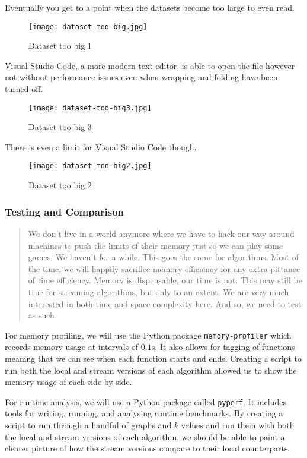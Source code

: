 Eventually you get to a point when the datasets become too large to even
read.

\begin{figure}[htb]
    \centering
    \texttt{[image: dataset-too-big.jpg]}
    \caption{Dataset too big 1}
\end{figure}

Visual Studio Code, a more modern text editor, is able to open the file
however not without performance issues even when wrapping and folding
have been turned off.

\begin{figure}[htb]
    \centering
    \texttt{[image: dataset-too-big3.jpg]}
    \caption{Dataset too big 3}
\end{figure}

There is even a limit for Visual Studio Code though.

\begin{figure}[htb]
    \centering
    \texttt{[image: dataset-too-big2.jpg]}
    \caption{Dataset too big 2}
\end{figure}

\subsubsection{Testing and Comparison}

\begin{quote}
    We don't live in a world anymore where we have to hack our way around
    machines to push the limits of their memory just so we can play some
    games. We haven't for a while. This goes the same for algorithms. Most
    of the time, we will happily sacrifice memory efficiency for any extra
    pittance of time efficiency. Memory is dispensable, our time is not.
    This may still be true for streaming algorithms, but only to an extent.
    We are very much interested in both time and space complexity here. And
    so, we need to test as such.
\end{quote}

For memory profiling, we will use the Python package
\texttt{memory-profiler} which records memory usage at intervals of
\(0.1\text{s}\). It also allows for tagging of functions meaning that we
can see when each function starts and ends. Creating a script to run
both the local and stream versions of each algorithm allowed us to show
the memory usage of each side by side.

For runtime analysis, we will use a Python package called
\texttt{pyperf}. It includes tools for writing, running, and analysing
runtime benchmarks. By creating a script to run through a handful of
graphs and \(k\) values and run them with both the local and stream
versions of each algorithm, we should be able to paint a clearer picture
of how the stream versions compare to their local counterparts.

